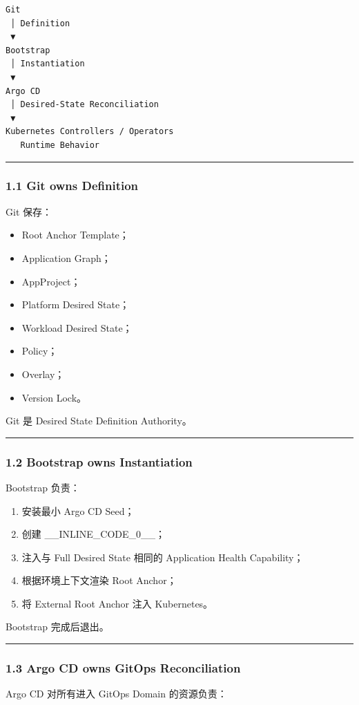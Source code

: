 \documentclass[11pt,a4paper]{article}
\begin{document}
\begin{lstlisting}[language=text]
Git
 │ Definition
 ▼
Bootstrap
 │ Instantiation
 ▼
Argo CD
 │ Desired-State Reconciliation
 ▼
Kubernetes Controllers / Operators
   Runtime Behavior
\end{lstlisting}
\vspace{0.5em}\hrule\vspace{0.5em}
\subsubsection{1.1 Git owns Definition}
Git 保存：

\begin{itemize}
  \item Root Anchor Template；
  \item Application Graph；
  \item AppProject；
  \item Platform Desired State；
  \item Workload Desired State；
  \item Policy；
  \item Overlay；
  \item Version Lock。
\end{itemize}
Git 是 Desired State Definition Authority。

\vspace{0.5em}\hrule\vspace{0.5em}
\subsubsection{1.2 Bootstrap owns Instantiation}
Bootstrap 负责：

\begin{enumerate}
  \item 安装最小 Argo CD Seed；
  \item 创建 \_\_INLINE\_CODE\_0\_\_；
  \item 注入与 Full Desired State 相同的 Application Health Capability；
  \item 根据环境上下文渲染 Root Anchor；
  \item 将 External Root Anchor 注入 Kubernetes。
\end{enumerate}
Bootstrap 完成后退出。

\vspace{0.5em}\hrule\vspace{0.5em}
\subsubsection{1.3 Argo CD owns GitOps Reconciliation}
Argo CD 对所有进入 GitOps Domain 的资源负责：
\end{document}
